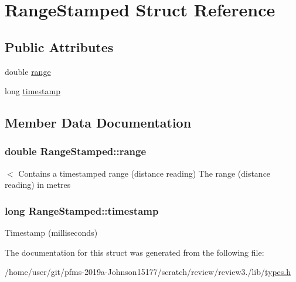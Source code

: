 \hypertarget{structRangeStamped}{}\section{Range\+Stamped Struct Reference}
\label{structRangeStamped}
\subsection*{Public Attributes}
\begin{DoxyCompactItemize}
\item 
double \hyperlink{structRangeStamped_a437c62efcfd2b3c6dc6eb9ec691146c1}{range}
\item 
long \hyperlink{structRangeStamped_ac6a16c00f75a51a9865ab98ccafbd2cc}{timestamp}
\end{DoxyCompactItemize}


\subsection{Member Data Documentation}
\subsubsection[{\texorpdfstring{range}{range}}]{\setlength{\rightskip}{0pt plus 5cm}double Range\+Stamped\+::range}\hypertarget{structRangeStamped_a437c62efcfd2b3c6dc6eb9ec691146c1}{}\label{structRangeStamped_a437c62efcfd2b3c6dc6eb9ec691146c1}
$<$ Contains a timestamped range (distance reading) The range (distance reading) in metres 
\subsubsection[{\texorpdfstring{timestamp}{timestamp}}]{\setlength{\rightskip}{0pt plus 5cm}long Range\+Stamped\+::timestamp}\hypertarget{structRangeStamped_ac6a16c00f75a51a9865ab98ccafbd2cc}{}\label{structRangeStamped_ac6a16c00f75a51a9865ab98ccafbd2cc}
Timestamp (milliseconds) 

The documentation for this struct was generated from the following file\+:\begin{DoxyCompactItemize}
\item 
/home/user/git/pfms-\/2019a-\/\+Johnson15177/scratch/review/review3./lib/\hyperlink{types_8h}{types.\+h}\end{DoxyCompactItemize}
